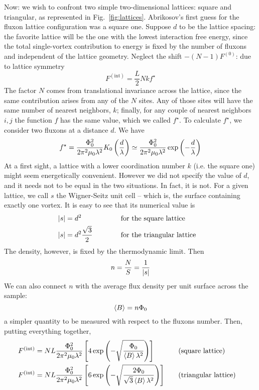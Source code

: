 Now: we wish to confront two simple two-dimensional lattices: square and triangular, as represented in Fig.~\ref{fig:lattices}. Abrikosov's first guess for the fluxon lattice configuration was a square one. Suppose $d$ to be the lattice spacing: the favorite lattice will be the one with the lowest interaction free energy, since the total single-vortex contribution to energy is fixed by the number of fluxons and independent of the lattice geometry. Neglect the shift $-(N-1) F^{(0)}$: due to lattice symmetry
\[
	F^{(\mathrm{int})} = \frac{L}{2} Nk f^\star
\]
The factor $N$ comes from translational invariance across the lattice, since the same contribution arises from any of the $N$ sites. Any of those sites will have the same number of nearest neighbors, $k$; finally, for any couple of nearest neighbors $i,j$ the function $f$ has the same value, which we called $f^\star$.
To calculate $f^\star$, we consider two fluxons at a distance $d$. We have
\[
	f^\star = \frac{\Phi_0^2}{2\pi^2\mu_0 \lambda^2} K_0 \left({\frac{d}{\lambda}}\right) \simeq \frac{\Phi_0^2}{2\pi^2\mu_0 \lambda^2} \exp \left({-\frac{d}{\lambda}}\right)
\]
At a first sight, a lattice with a lower coordination number $k$ (i.e. the square one) might seem energetically convenient. However we did not specify the value of $d$, and it needs not to be equal in the two situations. In fact, it is not. For a given lattice, we call $s$ the Wigner-Seitz unit cell -- which is, the surface containing exactly one vortex. It is easy to see that its numerical value is
\[
\begin{aligned}
	\abs{s} &= d^2 &&\qquad\qq{for the square lattice}\\
	\abs{s} &= d^2 \frac{\sqrt{3}}{2} &&\qquad\qq{for the triangular lattice}
\end{aligned}
\]
The density, however, is fixed by the thermodynamic limit. Then
\[
	n = \frac{N}{S} = \frac{1}{\abs{s}}
\]
We can also connect $n$ with the average flux density per unit surface across the sample:
\[
	\ev{B} = n \Phi_0
\]
a simpler quantity to be measured with respect to the fluxons number. Then, putting everything together,
\[
\begin{aligned}
	F^{(\mathrm{int})} &= NL \frac{\Phi_0^2}{2\pi^2\mu_0 \lambda^2} \lrS{4\exp \lrR{-\sqrt{\frac{\Phi_0}{\ev{B}\lambda^2}}}} &&\qq{(square lattice)}\\
	F^{(\mathrm{int})} &= NL \frac{\Phi_0^2}{2\pi^2\mu_0 \lambda^2} \lrS{6\exp \lrR{-\sqrt{\frac{2\Phi_0}{\sqrt{3}\ev{B}\lambda^2}}}} &&\qq{(triangular lattice)}
\end{aligned}
\]

